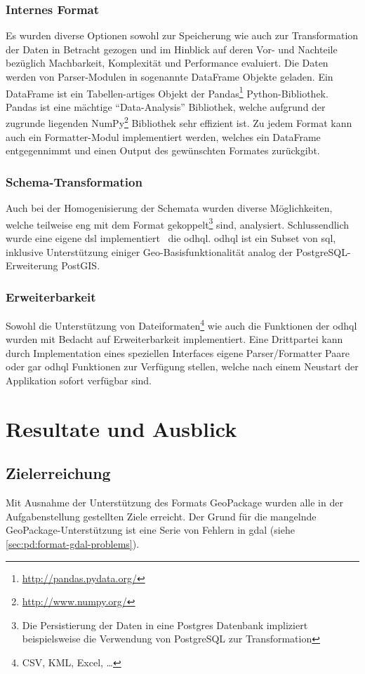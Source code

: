 \subsection{Internes Format}
Es wurden diverse Optionen sowohl zur Speicherung wie auch zur Transformation der Daten in Betracht gezogen und im Hinblick auf deren Vor- und Nachteile bezüglich Machbarkeit, Komplexität und Performance evaluiert. Die Daten werden von Parser-Modulen in sogenannte DataFrame Objekte geladen. 
Ein DataFrame ist ein Tabellen-artiges Objekt der Pandas\footnote{\url{http://pandas.pydata.org/}} Python-Bibliothek. Pandas ist eine mächtige ``Data-Analysis'' Bibliothek, welche aufgrund der zugrunde liegenden NumPy\footnote{\url{http://www.numpy.org/}} Bibliothek sehr effizient ist.
Zu jedem Format kann auch ein Formatter-Modul implementiert werden, welches ein DataFrame entgegennimmt und einen Output des gewünschten Formates zurückgibt.

\subsection{Schema-Transformation}
Auch bei der Homogenisierung der Schemata wurden diverse Möglichkeiten, welche teilweise eng mit dem Format gekoppelt\footnote{Die Persistierung der Daten in eine Postgres Datenbank impliziert beispielsweise die Verwendung von PostgreSQL zur Transformation} sind, analysiert. Schlussendlich wurde eine eigene \gls{dsl} implementiert \textendash\ die \acf{odhql}. \acs{odhql} ist ein Subset von \acs{sql}, inklusive Unterstützung einiger Geo-Basisfunktionalität analog der PostgreSQL-Erweiterung PostGIS.

\subsection{Erweiterbarkeit}
Sowohl die Unterstützung von Dateiformaten\footnote{CSV, KML, Excel, \dots} wie auch die Funktionen der \acl{odhql} wurden mit Bedacht auf Erweiterbarkeit implementiert. Eine Drittpartei kann durch Implementation eines speziellen Interfaces eigene Parser/Formatter Paare oder gar \gls{odhql} Funktionen zur Verfügung stellen, welche nach einem Neustart der Applikation sofort verfügbar sind.


\chapter{Resultate und Ausblick} \label{sec:tb:results}
\section{Zielerreichung}
Mit Ausnahme der Unterstützung des Formats GeoPackage wurden alle in der Aufgabenstellung gestellten Ziele erreicht. Der Grund für die mangelnde GeoPackage-Unterstützung ist eine Serie von Fehlern in \gls{gdal} (siehe \vref{sec:pd:format-gdal-problems}).

